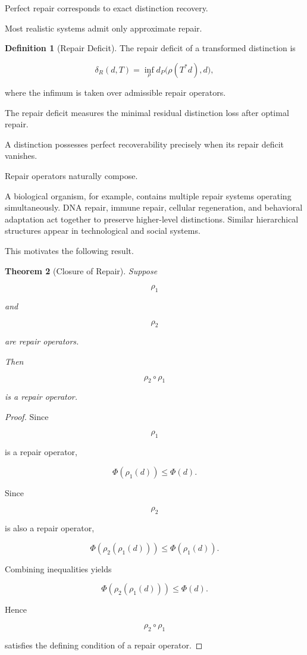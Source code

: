 \documentclass[12pt,oneside]{article}
\newtheorem{theorem}{Theorem}[section] \newtheorem{lemma}[theorem]{Lemma} \newtheorem{proposition}[theorem]{Proposition} \newtheorem{corollary}[theorem]{Corollary}
\theoremstyle{definition}
\newtheorem{definition}[theorem]{Definition} \newtheorem{axiom}[theorem]{Axiom} \newtheorem{remark}[theorem]{Remark} \newtheorem{example}[theorem]{Example}
\begin{document}
Perfect repair corresponds to exact distinction recovery.

Most realistic systems admit only approximate repair.

\begin{definition}[Repair Deficit]

The repair deficit of a transformed distinction is

\[
\delta_R(d,T)
=
\inf_{\rho}
d_P
\big(
\rho(T^*d),
d
\big),
\]

where the infimum is taken over admissible repair operators.

\end{definition}

The repair deficit measures the minimal residual distinction loss after optimal repair.

A distinction possesses perfect recoverability precisely when its repair deficit vanishes.

Repair operators naturally compose.

A biological organism, for example, contains multiple repair systems operating simultaneously. DNA repair, immune repair, cellular regeneration, and behavioral adaptation act together to preserve higher-level distinctions. Similar hierarchical structures appear in technological and social systems.

This motivates the following result.

\begin{theorem}[Closure of Repair]

Suppose

\[
\rho_1
\]

and

\[
\rho_2
\]

are repair operators.

Then

\[
\rho_2\circ\rho_1
\]

is a repair operator.

\end{theorem}

\begin{proof}

Since

\[
\rho_1
\]

is a repair operator,

\[
\Phi(\rho_1(d))
\le
\Phi(d).
\]

Since

\[
\rho_2
\]

is also a repair operator,

\[
\Phi(\rho_2(\rho_1(d)))
\le
\Phi(\rho_1(d)).
\]

Combining inequalities yields

\[
\Phi(\rho_2(\rho_1(d)))
\le
\Phi(d).
\]

Hence

\[
\rho_2\circ\rho_1
\]

satisfies the defining condition of a repair operator.

\end{proof}
\end{document}
